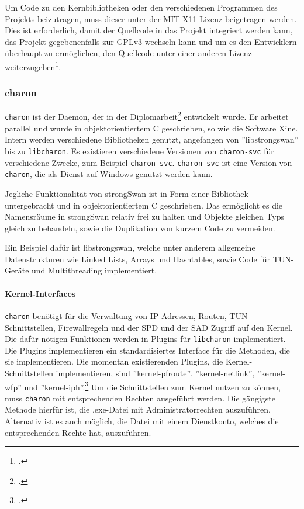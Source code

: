Um Code zu den Kernbibliotheken oder den verschiedenen Programmen des Projekts beizutragen,
muss dieser unter der MIT-X11-Lizenz beigetragen werden.
Dies ist erforderlich, damit der Quellcode in das Projekt integriert werden kann,
das Projekt gegebenenfalls zur GPLv3 wechseln kann und um es den Entwicklern überhaupt
zu ermöglichen, den Quellcode unter einer anderen Lizenz weiterzugeben\footcite[][Contributing]{_contributions_2014}.

\subsubsection{charon}
\texttt{charon} ist der Daemon, der in der Diplomarbeit\footcite[][]{jan_hutter_strongswan_2005} entwickelt wurde.
Er arbeitet parallel und wurde in objektorientiertem C geschrieben, so wie die Software Xine.
Intern werden verschiedene Bibliotheken genutzt, angefangen von ''libstrongswan'' bis zu \texttt{libcharon}.
Es existieren verschiedene Versionen von \texttt{charon-svc} für verschiedene Zwecke, zum Beispiel
\texttt{charon-svc}. \texttt{charon-svc} ist eine Version von \texttt{charon}, die als Dienst auf Windows genutzt werden kann.

Jegliche Funktionalität von strongSwan ist in Form einer Bibliothek untergebracht und in objektorientiertem
C geschrieben. Das ermöglicht es die Namensräume in strongSwan relativ frei zu halten
und Objekte gleichen Typs gleich zu behandeln, sowie die Duplikation von kurzem Code
zu vermeiden.

Ein Beispiel dafür ist libstrongswan, welche unter anderem 
allgemeine Datenstrukturen wie Linked Lists, Arrays und Hashtables, sowie Code für TUN-Geräte und
Multithreading implementiert.

\paragraph{Kernel-Interfaces}
\texttt{charon} benötigt für die Verwaltung von \ac{IP}-Adressen, Routen, TUN-Schnittstellen,
Firewallregeln und
der \ac{SPD} und der \ac{SAD} Zugriff auf den Kernel. Die dafür nötigen Funktionen
werden in Plugins für \texttt{libcharon} implementiert. Die Plugins implementieren ein
standardisiertes Interface für die Methoden, die sie implementieren.
Die momentan existierenden Plugins,
die Kernel-Schnittstellen implementieren, sind ''kernel-pfroute'', ''kernel-netlink'', ''kernel-wfp''
und ''kernel-iph''.\footcite[][]{_pluginlist_2016}
Um die Schnittstellen zum Kernel nutzen zu können, muss \texttt{charon} mit entsprechenden Rechten ausgeführt werden.
Die gängigste Methode hierfür ist, die .exe-Datei mit Administratorrechten auszuführen.
Alternativ ist es auch möglich, die Datei mit einem Dienstkonto, welches die entsprechenden Rechte hat,
auszuführen.

